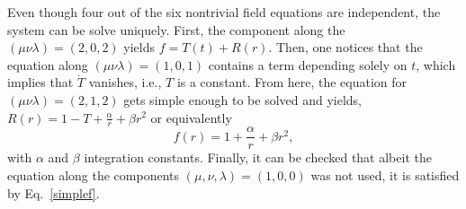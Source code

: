 \begin{widetext}
\end{widetext}
Even though four out of the six nontrivial field equations are independent, the system can be solve uniquely. First, the component along the $(\mu\nu\lambda) = (2,0,2)$ yields $f = T(t) + R(r)$. Then, one notices that the equation along $(\mu\nu\lambda) = (1,0,1)$ contains a term depending solely on $t$, which implies that $\dot{T}$ vanishes, i.e., $T$ is a constant. From here, the equation for $(\mu\nu\lambda) = (2,1,2)$ gets simple enough to be solved and yields, \mbox{$R(r) = 1 - T + \frac{\alpha}{r} + \beta r^2$} or equivalently
\begin{equation}
  f(r) = 1 + \frac{\alpha}{r} + \beta r^2,
  \label{simplef}
\end{equation}
with $\alpha$ and $\beta$ integration constants. Finally, it can be checked that albeit the equation along the components $(\mu,\nu,\lambda) = (1,0,0)$ was not used, it is satisfied by Eq.~\eqref{simplef}.

